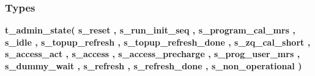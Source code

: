 \subsubsection*{Types}
 \begin{DoxyCompactItemize}
\item 
{\bfseries {\bf t\+\_\+admin\+\_\+state}{\bfseries \textcolor{vhdlchar}{(}\textcolor{vhdlchar}{ }\textcolor{vhdlchar}{s\+\_\+reset}\textcolor{vhdlchar}{ }\textcolor{vhdlchar}{,}\textcolor{vhdlchar}{ }\textcolor{vhdlchar}{s\+\_\+run\+\_\+init\+\_\+seq}\textcolor{vhdlchar}{ }\textcolor{vhdlchar}{,}\textcolor{vhdlchar}{ }\textcolor{vhdlchar}{s\+\_\+program\+\_\+cal\+\_\+mrs}\textcolor{vhdlchar}{ }\textcolor{vhdlchar}{,}\textcolor{vhdlchar}{ }\textcolor{vhdlchar}{s\+\_\+idle}\textcolor{vhdlchar}{ }\textcolor{vhdlchar}{,}\textcolor{vhdlchar}{ }\textcolor{vhdlchar}{s\+\_\+topup\+\_\+refresh}\textcolor{vhdlchar}{ }\textcolor{vhdlchar}{,}\textcolor{vhdlchar}{ }\textcolor{vhdlchar}{s\+\_\+topup\+\_\+refresh\+\_\+done}\textcolor{vhdlchar}{ }\textcolor{vhdlchar}{,}\textcolor{vhdlchar}{ }\textcolor{vhdlchar}{s\+\_\+zq\+\_\+cal\+\_\+short}\textcolor{vhdlchar}{ }\textcolor{vhdlchar}{,}\textcolor{vhdlchar}{ }\textcolor{vhdlchar}{s\+\_\+access\+\_\+act}\textcolor{vhdlchar}{ }\textcolor{vhdlchar}{,}\textcolor{vhdlchar}{ }\textcolor{vhdlchar}{s\+\_\+access}\textcolor{vhdlchar}{ }\textcolor{vhdlchar}{,}\textcolor{vhdlchar}{ }\textcolor{vhdlchar}{s\+\_\+access\+\_\+precharge}\textcolor{vhdlchar}{ }\textcolor{vhdlchar}{,}\textcolor{vhdlchar}{ }\textcolor{vhdlchar}{s\+\_\+prog\+\_\+user\+\_\+mrs}\textcolor{vhdlchar}{ }\textcolor{vhdlchar}{,}\textcolor{vhdlchar}{ }\textcolor{vhdlchar}{s\+\_\+dummy\+\_\+wait}\textcolor{vhdlchar}{ }\textcolor{vhdlchar}{,}\textcolor{vhdlchar}{ }\textcolor{vhdlchar}{s\+\_\+refresh}\textcolor{vhdlchar}{ }\textcolor{vhdlchar}{,}\textcolor{vhdlchar}{ }\textcolor{vhdlchar}{s\+\_\+refresh\+\_\+done}\textcolor{vhdlchar}{ }\textcolor{vhdlchar}{,}\textcolor{vhdlchar}{ }\textcolor{vhdlchar}{s\+\_\+non\+\_\+operational}\textcolor{vhdlchar}{ }\textcolor{vhdlchar}{)}\textcolor{vhdlchar}{ }}} 
\item 

\end{DoxyCompactItemize}
